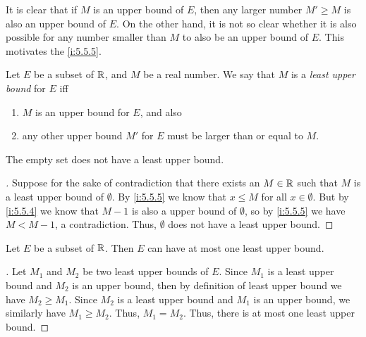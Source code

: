 \begin{note}
  It is clear that if \(M\) is an upper bound of \(E\), then any larger number \(M' \geq M\) is also an upper bound of \(E\).
  On the other hand, it is not so clear whether it is also possible for any number smaller than \(M\) to also be an upper bound of \(E\).
  This motivates the \cref{i:5.5.5}.
\end{note}

\begin{defn}\label{i:5.5.5}
  Let \(E\) be a subset of \(\mathbb{R}\), and \(M\) be a real number.
  We say that \(M\) is a \emph{least upper bound} for \(E\) iff
  \begin{enumerate}
    \item \(M\) is an upper bound for \(E\), and also
    \item any other upper bound \(M'\) for \(E\) must be larger than or equal to \(M\).
  \end{enumerate}
\end{defn}

\setcounter{thm}{6}
\begin{eg}\label{i:5.5.7}
  The empty set does not have a least upper bound.
\end{eg}

\begin{proof}[]
  Suppose for the sake of contradiction that there exists an \(M \in \mathbb{R}\) such that \(M\) is a least upper bound of \(\emptyset\).
  By \cref{i:5.5.5} we know that \(x \leq M\) for all \(x \in \emptyset\).
  But by \cref{i:5.5.4} we know that \(M - 1\) is also a upper bound of \(\emptyset\), so by \cref{i:5.5.5} we have \(M < M - 1\), a contradiction.
  Thus, \(\emptyset\) does not have a least upper bound.
\end{proof}

\begin{prop}\label{i:5.5.8}
  Let \(E\) be a subset of \(\mathbb{R}\).
  Then \(E\) can have at most one least upper bound.
\end{prop}

\begin{proof}[]
  Let \(M_1\) and \(M_2\) be two least upper bounds of \(E\).
  Since \(M_1\) is a least upper bound and \(M_2\) is an upper bound, then by definition of least upper bound we have \(M_2 \geq M_1\).
  Since \(M_2\) is a least upper bound and \(M_1\) is an upper bound, we similarly have \(M_1 \geq M_2\).
  Thus, \(M_1 = M_2\).
  Thus, there is at most one least upper bound.
\end{proof}

